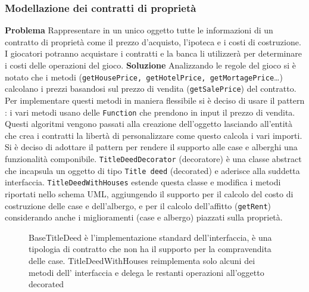 \subsubsection{Modellazione dei contratti di proprietà}
\textbf{Problema}\newline
Rappresentare in un unico oggetto tutte le informazioni di un contratto di proprietà come il prezzo d'acquisto, l'ipoteca e i costi di costruzione.
I giocatori potranno acquistare i contratti e la banca li utilizzerà per determinare i costi delle operazioni del gioco.\newline
\textbf{Soluzione}\newline
Analizzando le regole del gioco si è notato che i metodi  (\texttt{getHousePrice, getHotelPrice, getMortagePrice}\dots) 
calcolano i prezzi basandosi sul prezzo di vendita (\texttt{getSalePrice}) del contratto. Per implementare questi metodi in maniera flessibile 
si è deciso di usare il pattern :
i vari metodi  usano delle \texttt{Function} che prendono in input il prezzo di vendita. Questi algoritmi 
vengono passati alla creazione dell'oggetto lasciando all'entità che crea i contratti la libertà di personalizzare come questo calcola i vari importi.\newline
Si è deciso di adottare il pattern  per rendere il supporto alle case e alberghi una funzionalità componibile.
\texttt{TitleDeedDecorator} (decoratore) è una classe abstract che incapsula un oggetto di tipo \texttt{Title deed} (decorated) e aderisce alla suddetta interfaccia. 
\texttt{TitleDeedWithHouses} estende questa classe e modifica i metodi riportati nello schema UML, aggiungendo il supporto per il calcolo del costo di costruzione delle case e dell'albergo, 
e per il calcolo dell'affitto (\texttt{getRent}) considerando anche i miglioramenti
(case e albergo) piazzati sulla proprietà.\newline
\begin{figure}[H]
    \centering
    \caption{BaseTitleDeed è l'implementazione standard dell'interfaccia, è una tipologia di 
    contratto che non ha il supporto per la compravendita delle case. TitleDeedWithHouses reimplementa solo alcuni dei metodi dell' interfaccia
    e delega le restanti operazioni all'oggetto decorated}
	\label{img:TitleDeed}
\end{figure}
